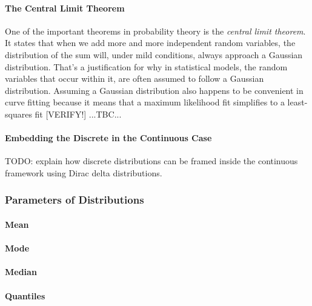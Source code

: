 \paragraph{The Central Limit Theorem}
One of the important theorems in probability theory is the \emph{central limit theorem}. It states that when we add more and more independent random variables, the distribution of the sum will, under mild conditions, always approach a Gaussian distribution. That's a justification for why in statistical models, the random variables that occur within it, are often assumed to follow a Gaussian distribution. Assuming a Gaussian distribution also happens to be convenient in curve fitting because it means that a maximum likelihood fit simplifies to a least-squares fit [VERIFY!] ...TBC...


\paragraph{Embedding the Discrete in the Continuous Case}
TODO: explain how discrete distributions can be framed inside the continuous framework using Dirac delta distributions. 


\subsubsection{Parameters of Distributions}

\paragraph{Mean}

\paragraph{Mode}

\paragraph{Median}

\paragraph{Quantiles}

